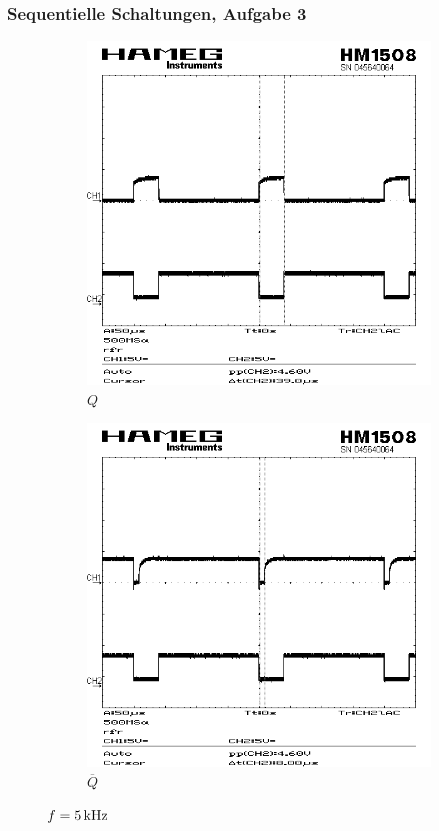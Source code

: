 \documentclass[numbers=noenddot,12pt,a4paper]{scrartcl}
\newcommand{\nicht}[1]{\overline{#1}}
\begin{document}
\subsubsection{Sequentielle Schaltungen, Aufgabe 3}
\begin{figure}[H]
\centering
\begin{subfigure}[b]{0.48\textwidth}
\includegraphics[width=\textwidth]{seq15khzq.png}
\caption{$Q$}
\end{subfigure}
\begin{subfigure}[b]{0.48\textwidth}
\includegraphics[width=\textwidth]{seq15khzqquer.png}
\caption{$\nicht{Q}$}
\end{subfigure}
\caption{$f=\unit[5]{kHz}$} \label{img:5khz}
\end{figure}
\end{document}
